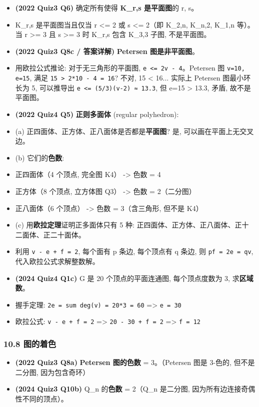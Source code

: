 \documentclass[10pt,a4paper,openany]{ctexbook}
\theoremstyle{definition}
\theoremstyle{remark}
\begin{document}
\begin{itemize}
\item \textbf{(2022 Quiz3 Q6)} 确定所有使得 \textbf{K\_{r,s} 是平面图}的 r, s。
\item K\_{r,s} 是平面图当且仅当 r <= 2 或 s <= 2（即 K\_{2,n}, K\_{n,2}, K\_{1,n} 等）。当 r >= 3 且 s >= 3 时 K\_{r,s} 包含 K\_{3,3} 子图, 不是平面图。

\item \textbf{(2022 Quiz3 Q8c / 答案详解)} \textbf{Petersen 图是非平面图}。
\item 用欧拉公式推论: 对于无三角形的平面图, \texttt{e <= 2v - 4}。Petersen 图 \texttt{v=10, e=15}, 满足 \texttt{15 > 2*10 - 4 = 16}? 不对, 15 < 16... 实际上 Petersen 图最小环长为 5, 可以推导出 \texttt{e <= (5/3)(v-2) ≈ 13.3}, 但 e=15 > 13.3, 矛盾, 故不是平面图。

\item \textbf{(2022 Quiz4 Q5)} \textbf{正则多面体} (regular polyhedron):
\item (a) 正四面体、正方体、正八面体是否都是\textbf{平面图}? 是, 可以画在平面上无交叉边。
\item (b) 它们的\textbf{色数}:
\item 正四面体（4 个顶点, 完全图 K4） -> 色数 = 4
\item 正方体（8 个顶点, 立方体图 Q3） -> 色数 = 2（二分图）
\item 正八面体（6 个顶点） -> 色数 = 3（含三角形, 但不是 K4）
\item (c) 用\textbf{欧拉定理}证明正多面体只有 5 种: 正四面体、正方体、正八面体、正十二面体、正二十面体。
\item 利用 \texttt{v - e + f = 2}, 每个面有 p 条边, 每个顶点有 q 条边, 则 \texttt{pf = 2e = qv}, 代入欧拉公式求解整数解。

\item \textbf{(2024 Quiz4 Q1c)} G 是 20 个顶点的平面连通图, 每个顶点度数为 3, 求\textbf{区域数}。
\item 握手定理: \texttt{2e = sum deg(v) = 20*3 = 60} => \texttt{e = 30}
\item 欧拉公式: \texttt{v - e + f = 2} => \texttt{20 - 30 + f = 2} => \texttt{f = 12}

\end{itemize}

\subsubsection{10.8 图的着色}

\begin{itemize}
\item \textbf{(2022 Quiz3 Q8a)} \textbf{Petersen 图的色数} = 3。（Petersen 图是 3-色的, 但不是二分图, 因为包含奇环）

\item \textbf{(2024 Quiz3 Q10b)} Q\_n 的\textbf{色数} = 2（Q\_n 是二分图, 因为所有边连接奇偶性不同的顶点）。

\end{itemize}
\end{document}

